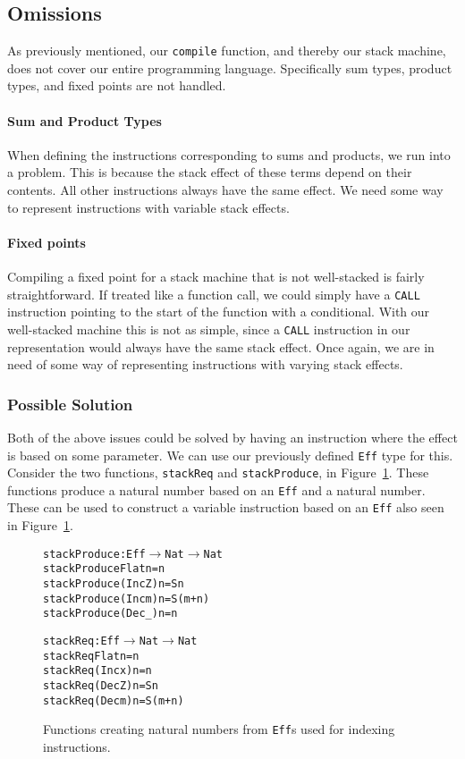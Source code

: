 \subsection{Omissions}
\label{sec:omissions}
As previously mentioned, our \texttt{compile} function, and thereby our stack machine, does not cover our entire programming language. Specifically sum types, product types, and fixed points are not handled. 

\paragraph{Sum and Product Types}
When defining the instructions corresponding to sums and products, we run into a problem. This is because the stack effect of these terms depend on their contents. All other instructions always have the same effect. We need some way to represent instructions with variable stack effects.

\paragraph{Fixed points}
Compiling a fixed point for a stack machine that is not well-stacked is fairly straightforward. If treated like a function call, we could simply have a \texttt{CALL} instruction pointing to the start of the function with a conditional. With our well-stacked machine this is not as simple, since a \texttt{CALL} instruction in our representation would always have the same stack effect. Once again, we are in need of some way of representing instructions with varying stack effects.

\subsubsection{Possible Solution}
Both of the above issues could be solved by having an instruction where the effect is based on some parameter. We can use our previously defined \texttt{Eff} type for this. Consider the two functions, \texttt{stackReq} and \texttt{stackProduce}, in Figure~\ref{fig:stack_effect_functions}. These functions produce a natural number based on an \texttt{Eff} and a natural number. These can be used to construct a variable instruction based on an \texttt{Eff} also seen in Figure~\ref{fig:stack_effect_functions}. 

\begin{figure}
\begin{alltt}
stackProduce : Eff \(\to\) Nat \(\to\) Nat
stackProduce Flat    n = n
stackProduce (Inc Z) n = S n
stackProduce (Inc m) n = S (m+n)
stackProduce (Dec _) n = n

stackReq : Eff \(\to\) Nat \(\to\) Nat
stackReq Flat    n = n
stackReq (Inc x) n = n
stackReq (Dec Z) n = S n
stackReq (Dec m) n = S (m+n)
\end{alltt}
\caption{Functions creating natural numbers from \texttt{Eff}s used for indexing instructions.}
\label{fig:stack_effect_functions}
\end{figure}

